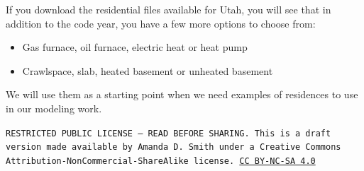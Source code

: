 \documentclass[10pt]{article}
\begin{document}
If you download the residential files available for Utah, you will see that in addition to the code year, you have a few more options to choose from:

\begin{itemize}
    \setlength{\itemsep}{0pt}%
    \setlength{\parskip}{0pt}%
    \item Gas furnace, oil furnace, electric heat or heat pump
    \item Crawlspace, slab, heated basement or unheated basement
\end{itemize}

We will use them as a starting point when we need examples of residences to use in our modeling work.


\bigskip

\noindent
\texttt{\footnotesize RESTRICTED PUBLIC LICENSE --- READ BEFORE SHARING. This is a draft version made available by Amanda D. Smith under a Creative Commons Attribution-NonCommercial-ShareAlike license. 
\href{https://creativecommons.org/licenses/by-nc-sa/4.0/}{CC BY-NC-SA 4.0}}

\newpage
\printbibliography
\end{document}
